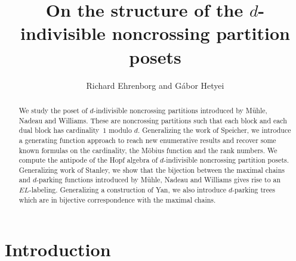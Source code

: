 \documentclass[11pt]{amsart}
\numberwithin{equation}{section}
\begin{document}
\vspace*{-20 mm}

\title{On the structure of the $d$-indivisible noncrossing partition posets}
\author{Richard Ehrenborg and G\'abor Hetyei}

\address{Department of Mathematics, University of Kentucky,
Lexington, KY 40506-0027.
\hfill\break \tt http://www.math.uky.edu/\~{}jrge/,
  richard.ehrenborg@uky.edu.}

\address{Department of Mathematics and Statistics, UNC Charlotte,
Charlotte NC 28223-0001.
\hfill\break \tt http://webpages.charlotte.edu/ghetyei/,
ghetyei@charlotte.edu.}







\begin{abstract}
We study the poset of $d$-indivisible noncrossing partitions introduced
by M\"uhle, Nadeau and Williams. These are noncrossing partitions such
that each block and each dual block has cardinality~$1$ modulo $d$. 
Generalizing the work of Speicher, we introduce a generating function
approach to reach new enumerative results and recover some known
formulas on the cardinality, the M\"obius function and the rank numbers.
We compute the antipode of the Hopf algebra of $d$-indivisible
noncrossing partition posets. Generalizing work of Stanley, we show that
the bijection between the maximal chains and $d$-parking functions
introduced by M\"uhle, Nadeau and Williams gives rise to an $EL$-labeling. 
Generalizing a construction of Yan, we also introduce $d$-parking trees
which are in bijective correspondence with the maximal chains.  
\end{abstract}

\maketitle

\section{Introduction}
\end{document}
